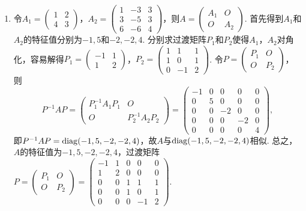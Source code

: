 \begin{enumerate}
    \item 令$A_1=\begin{pmatrix}
                  1 & 2 \\ 4 & 3
              \end{pmatrix}$，$A_2=\begin{pmatrix}
                  1 & -3 & 3 \\ 3 & -5 & 3 \\ 6 & -6 & 4
              \end{pmatrix}$，则$A=\begin{pmatrix}
                  A_1 & O \\ O & A_2
              \end{pmatrix}$. 首先得到$A_1$和$A_2$的特征值分别为$-1,5$和$-2,-2,4$. 分别求过渡矩阵$P_1$和$P_2$使得$A_1$，$A_2$对角化，容易解得$P_1=\begin{pmatrix}
                  -1 & 1 \\ 1 & 2
              \end{pmatrix}$，$P_2=\begin{pmatrix}
                  1 & 1 & 1 \\ 1 & 0 & 1 \\ 0 & -1 & 2
              \end{pmatrix}$. 令$P=\begin{pmatrix}
                  P_1 & O \\ O & P_2
              \end{pmatrix}$，则
          \[P^{-1}AP=\begin{pmatrix}
                  P_1^{-1}A_1P_1 & O \\ O & P_2^{-1}A_2P_2
              \end{pmatrix}=\begin{pmatrix}
                  -1 & 0 & 0 & 0 & 0 \\ 0 & 5 & 0 & 0 & 0 \\ 0 & 0 & -2 & 0 & 0 \\ 0 & 0 & 0 & -2 & 0 \\ 0 & 0 & 0 & 0 & 4
              \end{pmatrix},\]
          即$P^{-1}AP=\operatorname{diag}(-1,5,-2,-2,4)$，故$A$与$\operatorname{diag}(-1,5,-2,-2,4)$相似. 总之，$A$的特征值为$-1,5,-2,-2,4$，过渡矩阵$P=\begin{pmatrix}
                  P_1 & O \\ O & P_2
              \end{pmatrix}=\begin{pmatrix}
                  -1 & 1 & 0 & 0 & 0 \\ 1 & 2 & 0 & 0 & 0 \\ 0 & 0 & 1 & 1 & 1 \\ 0 & 0 & 1 & 0 & 1 \\ 0 & 0 & 0 & -1 & 2
              \end{pmatrix}$.


\end{enumerate}
